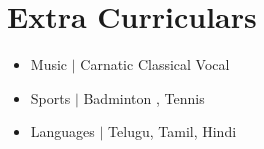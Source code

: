 \documentclass{resume_class}
\begin{document}
\section{Extra Curriculars }
\begin{itemize}[leftmargin = 10pt , labelsep = 3pt , parsep = 0pt , itemsep = 2pt , label =  {\small $\bullet$} ] 
	\item \mdseries \large  {Music \hspace {0.1 mm} $ \boldsymbol{|} $ }  \normalsize{Carnatic Classical Vocal} 
	\item \mdseries \large {Sports \hspace {0.15 mm}$ \boldsymbol{|} $ }  \normalsize {Badminton , Tennis}
	\item \mdseries \large  {Languages $ \boldsymbol{|} $ }  \normalsize{Telugu, Tamil, Hindi} 
\end{itemize}
\end{document}
